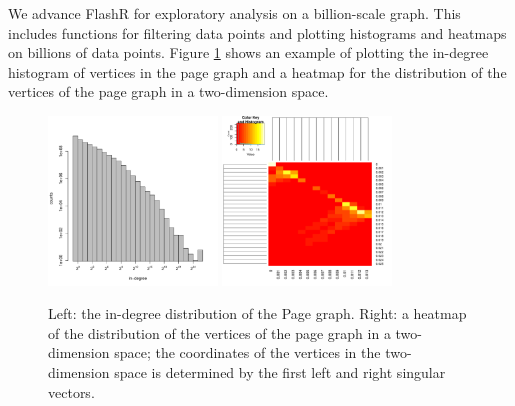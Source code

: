 \documentclass[simplex.tex]{subfiles}
\begin{document}
\clearpage
We advance FlashR for exploratory analysis on a billion-scale
graph. This includes functions for filtering data points and plotting
histograms and heatmaps on billions of data points. Figure \ref{fig:FlashX}
shows an example of plotting the in-degree histogram of vertices in the page
graph and a heatmap for the distribution of the vertices of the page graph in
a two-dimension space.

\begin{figure}[!h]
\begin{cframed}
\centering
\includegraphics[width=0.4\textwidth]{../../figs/hist-indeg.pdf}
\includegraphics[width=0.4\textwidth]{../../figs/pg_xy_heatmap.pdf}
\caption{Left: the in-degree distribution of the Page graph.
	Right: a heatmap of the distribution of the vertices of the page graph
	in a two-dimension space; the coordinates of the vertices
	in the two-dimension space is determined by the first left and right
	singular vectors.}
\label{fig:FlashX}
\end{cframed}
\end{figure}

\clearpage
\end{document}
